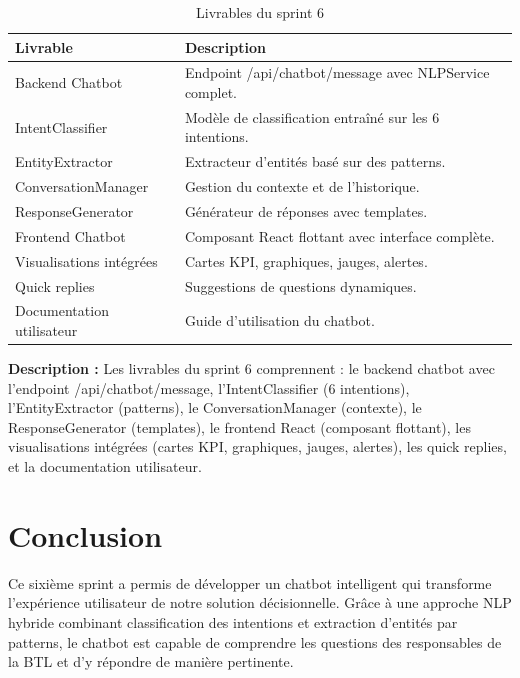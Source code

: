 \begin{table}[H]
\centering
\begin{tabular}{|p{4cm}|p{9cm}|}
\hline
\textbf{Livrable} & \textbf{Description} \\
\hline
Backend Chatbot & Endpoint /api/chatbot/message avec NLPService complet. \\
\hline
IntentClassifier & Modèle de classification entraîné sur les 6 intentions. \\
\hline
EntityExtractor & Extracteur d'entités basé sur des patterns. \\
\hline
ConversationManager & Gestion du contexte et de l'historique. \\
\hline
ResponseGenerator & Générateur de réponses avec templates. \\
\hline
Frontend Chatbot & Composant React flottant avec interface complète. \\
\hline
Visualisations intégrées & Cartes KPI, graphiques, jauges, alertes. \\
\hline
Quick replies & Suggestions de questions dynamiques. \\
\hline
Documentation utilisateur & Guide d'utilisation du chatbot. \\
\hline
\end{tabular}
\caption{Livrables du sprint 6}
\label{tab:sprint6-livrables}
\end{table}

\textbf{Description :} Les livrables du sprint 6 comprennent : le backend chatbot avec l'endpoint /api/chatbot/message, l'IntentClassifier (6 intentions), l'EntityExtractor (patterns), le ConversationManager (contexte), le ResponseGenerator (templates), le frontend React (composant flottant), les visualisations intégrées (cartes KPI, graphiques, jauges, alertes), les quick replies, et la documentation utilisateur.

\section*{Conclusion}

Ce sixième sprint a permis de développer un chatbot intelligent qui transforme l'expérience utilisateur de notre solution décisionnelle. Grâce à une approche NLP hybride combinant classification des intentions et extraction d'entités par patterns, le chatbot est capable de comprendre les questions des responsables de la BTL et d'y répondre de manière pertinente.

